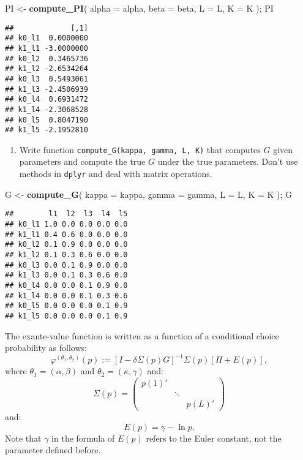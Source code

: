 \documentclass[
]{book}
\newenvironment{Shaded}{\begin{snugshade}}{\end{snugshade}}
\newcommand{\AttributeTok}[1]{\textcolor[rgb]{0.13,0.29,0.53}{#1}}
\newcommand{\FunctionTok}[1]{\textcolor[rgb]{0.13,0.29,0.53}{\textbf{#1}}}
\newcommand{\NormalTok}[1]{#1}
\newcommand{\OtherTok}[1]{\textcolor[rgb]{0.56,0.35,0.01}{#1}}
\providecommand{\tightlist}{%
  \setlength{\itemsep}{0pt}\setlength{\parskip}{0pt}}
\begin{document}
\begin{Shaded}
\begin{Highlighting}[]
\NormalTok{PI }\OtherTok{\textless{}{-}} 
  \FunctionTok{compute\_PI}\NormalTok{(}
    \AttributeTok{alpha =}\NormalTok{ alpha, }
    \AttributeTok{beta =}\NormalTok{ beta, }
    \AttributeTok{L =}\NormalTok{ L, }
    \AttributeTok{K =}\NormalTok{ K}
\NormalTok{    ); }
\NormalTok{PI}
\end{Highlighting}
\end{Shaded}

\begin{verbatim}
##             [,1]
## k0_l1  0.0000000
## k1_l1 -3.0000000
## k0_l2  0.3465736
## k1_l2 -2.6534264
## k0_l3  0.5493061
## k1_l3 -2.4506939
## k0_l4  0.6931472
## k1_l4 -2.3068528
## k0_l5  0.8047190
## k1_l5 -2.1952810
\end{verbatim}

\begin{enumerate}
\def\labelenumi{\arabic{enumi}.}
\setcounter{enumi}{2}
\tightlist
\item
  Write function \texttt{compute\_G(kappa,\ gamma,\ L,\ K)} that computes \(G\) given parameters and compute the true \(G\) under the true parameters. Don't use methods in \texttt{dplyr} and deal with matrix operations.
\end{enumerate}

\begin{Shaded}
\begin{Highlighting}[]
\NormalTok{G }\OtherTok{\textless{}{-}} 
  \FunctionTok{compute\_G}\NormalTok{(}
    \AttributeTok{kappa =}\NormalTok{ kappa, }
    \AttributeTok{gamma =}\NormalTok{ gamma, }
    \AttributeTok{L =}\NormalTok{ L, }
    \AttributeTok{K =}\NormalTok{ K}
\NormalTok{    ); }
\NormalTok{G}
\end{Highlighting}
\end{Shaded}

\begin{verbatim}
##        l1  l2  l3  l4  l5
## k0_l1 1.0 0.0 0.0 0.0 0.0
## k1_l1 0.4 0.6 0.0 0.0 0.0
## k0_l2 0.1 0.9 0.0 0.0 0.0
## k1_l2 0.1 0.3 0.6 0.0 0.0
## k0_l3 0.0 0.1 0.9 0.0 0.0
## k1_l3 0.0 0.1 0.3 0.6 0.0
## k0_l4 0.0 0.0 0.1 0.9 0.0
## k1_l4 0.0 0.0 0.1 0.3 0.6
## k0_l5 0.0 0.0 0.0 0.1 0.9
## k1_l5 0.0 0.0 0.0 0.1 0.9
\end{verbatim}

The exante-value function is written as a function of a conditional choice probability as follows:
\[
\varphi^{(\theta_1, \theta_2)}(p) := [I - \delta \Sigma(p) G]^{-1}\Sigma(p)[\Pi + E(p)],
\]
where \(\theta_1 = (\alpha, \beta)\) and \(\theta_2 = (\kappa, \gamma)\) and:
\[
\Sigma(p) =
\begin{pmatrix}
p(1)' & & \\
 & \ddots & \\
 & & p(L)'
\end{pmatrix}
\]
and:
\[
E(p) = 
\gamma - \ln p.
\]
Note that \(\gamma\) in the formula of \(E(p)\) refers to the Euler constant, not the parameter defined before.
\end{document}
